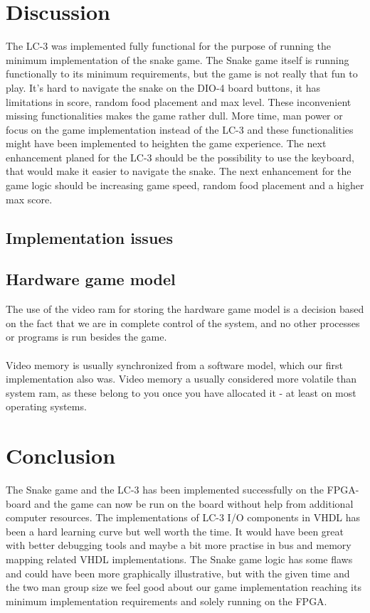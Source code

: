 \documentclass{acm_proc_article-sp}
\begin{document}
\section{Discussion}
The LC-3 was implemented fully functional for the purpose of running the minimum implementation of the snake game.
The Snake game itself is running functionally to its minimum requirements, but the game is not really that fun to play. 
It's hard to navigate the snake on the DIO-4 board buttons, it has limitations in score, random food placement and max level.
These inconvenient missing functionalities makes the game rather dull. More time, man power or focus on the game implementation instead of the LC-3 and these functionalities might have been implemented to heighten the game experience.
The next enhancement planed for the LC-3 should be the possibility to use the keyboard, that would make it easier to navigate the snake.
The next enhancement for the game logic should be increasing game speed, random food placement and a higher max score.
\subsection{Implementation issues}

\subsection{Hardware game model}
The use of the video ram for storing the hardware game model is a decision based on the fact that we are in complete control of the system, and no other processes or programs is run besides the game.\\\\
Video memory is usually synchronized from a software model, which our first implementation also was. Video memory a usually considered more volatile than system ram, as these belong to you once you have allocated it - at least on most operating systems.

\section{Conclusion}
The Snake game and the LC-3 has been implemented successfully on the FPGA-board and the game can now be run on the board without help from additional computer resources. 
The implementations of LC-3 I/O components in VHDL has been a hard learning curve but well worth the time.
It would have been great with better debugging tools and maybe a bit more practise in bus and memory mapping related VHDL implementations.
The Snake game logic has some flaws and could have been more graphically illustrative, but with the given time and the two man group size we feel good about our game implementation reaching its minimum implementation requirements and solely running on the FPGA. 
\end{document}
